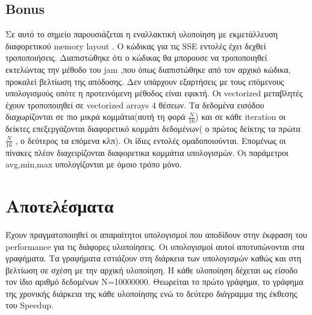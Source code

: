 \documentclass[11pt]{article}
\begin{document}
\subsection{ Bonus }
\hspace*{8mm}Σε αυτό το σημείο παρουσιάζεται η εναλλακτική υλοποίηση με εκμετάλλευση διαφορετικού memory layout . Ο κώδικας για τις SSE εντολές έχει δεχθεί τροποποιήσεις. Διαπιστώθηκε ότι ο κώδικας θα μπορουσε να τροποποιηθεί εκτελώντας την μέθοδο του jam ,που όπως διαπιστώθηκε από τον αρχικό κώδικα, προκαλεί βελτίωση της απόδοσης. Δεν υπάρχουν εξαρτήσεις με τους επόμενους υπολογισμούς οπότε η προτεινόμενη μέθοδος είναι εφικτή. Οι vectorized μεταβλητές έχουν τροποποιηθεί σε vectorized arrays  4 θέσεων. Τα δεδομένα εισόδου διαχωρίζονται σε πιο μικρά κομμάτια(αυτή τη φορά $\frac{Ν}{16}$) και σε κάθε  iteration  οι δείκτες επεξεργάζονται διαφορετικό κομμάτι δεδομένων( ο πρώτος δείκτης τα πρώτα  $\frac{Ν}{16}$ , ο δεύτερος τα επόμενα κλπ). Οι ίδιες εντολές ομαδοποιούνται. Επομένως οι πίνακες πλέον διαχειρίζονται διαφορετικα κομμάτια υπολογισμών. Οι παράμετροι  avg,min,max  υπολογίζονται με όμοιο τρόπο μόνο.

\vspace{20mm}
\section{Αποτελέσματα}
\hspace*{8mm}Έχουν πραγματοποιηθεί οι απαραίτητοι υπολογισμοί που αποδίδουν στην έκφραση του performance για τις διάφορες υλοποίησεις. Οι υπολογισμοί αυτοί αποτυπώνονται στα γραφήματα. Τα γραφήματα εστιάζουν στη διάρκεια των υπολογισμών καθώς και στη βελτίωση σε σχέση με την αρχική υλοποίηση. Η κάθε υλοποίηση δέχεται ως είσοδο τον ίδιο αριθμό δεδομένων Ν=10000000. Θεωρείται το πρώτο γράφημα, το γράφημα της χρονικής διάρκεια της κάθε υλοποίησης ενώ το δεύτερο διάγραμμα της έκθεσης του Speedup.
\end{document}
